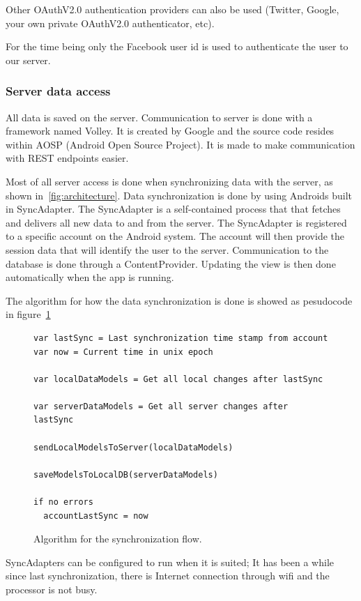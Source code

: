 Other OAuthV2.0 authentication providers can also be used (Twitter, Google, your own private OAuthV2.0 authenticator, etc). 

For the time being only the Facebook user id is used to authenticate the user to our server.

\subsubsection{Server data access}

All data is saved on the server. Communication to server is done with a framework named Volley. It is created by Google and the source code resides within AOSP (Android Open Source Project). It is made to make communication with REST endpoints easier.

Most of all server access is done when synchronizing data with the server, as shown in~\ref{fig:architecture}. 
Data synchronization is done by using Androids built in SyncAdapter. The SyncAdapter is a self-contained process that that fetches and delivers all new data to and from the server. The SyncAdapter is registered to a specific account on the Android system. The account will then provide the session data that will identify the user to the server.
Communication to the database is done through a ContentProvider. Updating the view is then done automatically when the app is running. 

The algorithm for how the data synchronization is done is showed as pesudocode in figure~\ref{fig:algorithm_sync}

\begin{figure}[H]
\begin{lstlisting}[]
var lastSync = Last synchronization time stamp from account
var now = Current time in unix epoch

var localDataModels = Get all local changes after lastSync

var serverDataModels = Get all server changes after lastSync

sendLocalModelsToServer(localDataModels)

saveModelsToLocalDB(serverDataModels)

if no errors
  accountLastSync = now
\end{lstlisting}
\caption{Algorithm for the synchronization flow.}
\label{fig:algorithm_sync}
\end{figure}

SyncAdapters can be configured to run when it is suited; It has been a while since last synchronization, there is Internet connection through wifi and the processor is not busy.

